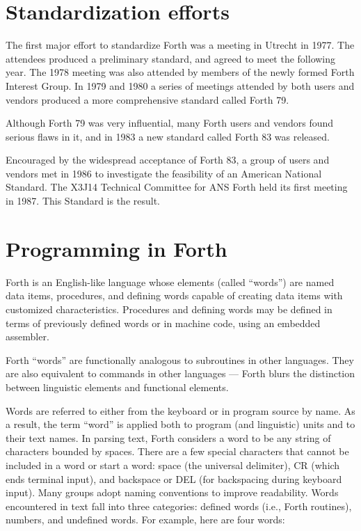 \section{Standardization efforts} %

The first major effort to standardize Forth was a meeting in Utrecht
in 1977. The attendees produced a preliminary standard, and agreed
to meet the following year. The 1978 meeting was also attended by
members of the newly formed Forth Interest Group. In 1979 and 1980
a series of meetings attended by both users and vendors produced a
more comprehensive standard called Forth 79.

Although Forth 79 was very influential, many Forth users and vendors
found serious flaws in it, and in 1983 a new standard called Forth 83
was released.

Encouraged by the widespread acceptance of Forth 83, a group of users
and vendors met in 1986 to investigate the feasibility of an American
National Standard. The X3J14 Technical Committee for ANS Forth held
its first meeting in 1987. This Standard is the result.


\section{Programming in Forth} %

Forth is an English-like language whose elements (called ``words'')
are named data items, procedures, and defining words capable of
creating data items with customized characteristics. Procedures and
defining words may be defined in terms of previously defined words
or in machine code, using an embedded assembler.

Forth ``words'' are functionally analogous to subroutines in other
languages. They are also equivalent to commands in other languages
--- Forth blurs the distinction between linguistic elements and
functional elements.

Words are referred to either from the keyboard or in program source
by name. As a result, the term ``word'' is applied both to program
(and linguistic) units and to their text names. In parsing text, Forth
considers a word to be any string of characters bounded by spaces.
There are a few special characters that cannot be included in a word
or start a word: space (the universal delimiter), CR (which ends
terminal input), and backspace or DEL (for backspacing during
keyboard input). Many groups adopt naming conventions to improve
readability. Words encountered in text fall into three categories:
defined words (i.e., Forth routines), numbers, and undefined words.
For example, here are four words:

